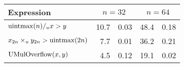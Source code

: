\begin{tabular}{lr@{$\pm$}lr@{$\pm$}l} \toprule
Expression & \multicolumn{2}{c}{$n = 32$} & \multicolumn{2}{c}{$n = 64$} \\ \midrule
$\operatorname{uintmax}(n) /_u x > y$
& 10.7 & 0.03 & 48.4 & 0.18 \\
$x_{2n} \times_{u} y_{2n} > \operatorname{uintmax}(2n)$
&  7.7 & 0.01 & 36.2 & 0.21 \\
$\operatorname{UMulOverflow}(x, y)$
&  4.5 & 0.12 & 19.1 & 0.02 \\
\bottomrule
\end{tabular}
